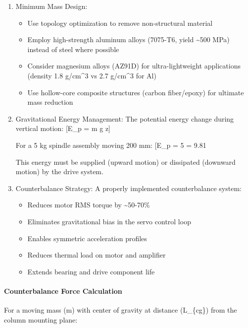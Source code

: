 \documentclass[
]{article}
\providecommand{\tightlist}{%
  \setlength{\itemsep}{0pt}\setlength{\parskip}{0pt}}
\begin{document}
\begin{enumerate}
\def\labelenumi{\arabic{enumi}.}
\item
  Minimum Mass Design:

  \begin{itemize}
  \tightlist
  \item
    Use topology optimization to remove non-structural material
  \item
    Employ high-strength aluminum alloys (7075-T6, yield
    \textasciitilde500 MPa) instead of steel where possible
  \item
    Consider magnesium alloys (AZ91D) for ultra-lightweight applications
    (density 1.8 g/cm\^{}3 vs 2.7 g/cm\^{}3 for Al)
  \item
    Use hollow-core composite structures (carbon fiber/epoxy) for
    ultimate mass reduction
  \end{itemize}
\item
  Gravitational Energy Management: The potential energy change during
  vertical motion: {[}\Delta E\_p = m g \Delta z{]}

  For a 5 kg spindle assembly moving 200 mm: {[}\Delta E\_p = 5
    = 9.81 \text{ J}{]}

  This energy must be supplied (upward motion) or dissipated (downward
  motion) by the drive system.
\item
  Counterbalance Strategy: A properly implemented counterbalance system:

  \begin{itemize}
  \tightlist
  \item
    Reduces motor RMS torque by \textasciitilde50-70\%
  \item
    Eliminates gravitational bias in the servo control loop
  \item
    Enables symmetric acceleration profiles
  \item
    Reduces thermal load on motor and amplifier
  \item
    Extends bearing and drive component life
  \end{itemize}
\end{enumerate}

\paragraph{Counterbalance Force
Calculation}\label{counterbalance-force-calculation}

For a moving mass (m) with center of gravity at distance (L\_\{cg\})
from the column mounting plane:
\end{document}
